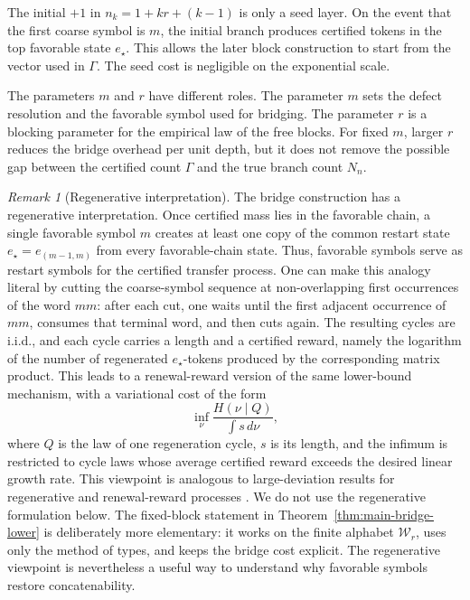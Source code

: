 \documentclass[11pt]{amsart}
\numberwithin{equation}{section}
\theoremstyle{plain}
\theoremstyle{definition}
\theoremstyle{remark}
\newtheorem{remark}[theorem]{Remark}
\begin{document}
The initial \(+1\) in \(n_k=1+kr+(k-1)\) is only a seed layer. On the event that the first coarse symbol is \(m\), the initial branch produces certified tokens in the top favorable state \(e_\star\). This allows the later block construction to start from the vector used in \(\Gamma\). The seed cost is negligible on the exponential scale.

The parameters \(m\) and \(r\) have different roles. The parameter \(m\) sets the defect resolution and the favorable symbol used for bridging. The parameter \(r\) is a blocking parameter for the empirical law of the free blocks. For fixed \(m\), larger \(r\) reduces the bridge overhead per unit depth, but it does not remove the possible gap between the certified count \(\Gamma\) and the true branch count \(N_n\).

\begin{remark}[Regenerative interpretation]\label{rem:regenerative-interpretation}
The bridge construction has a regenerative interpretation. Once certified
mass lies in the favorable chain, a single favorable symbol \(m\) creates at
least one copy of the common restart state \(e_\star=e_{(m-1,m)}\) from every
favorable-chain state. Thus, favorable symbols serve as restart symbols
for the certified transfer process.
One can make this analogy literal by cutting the coarse-symbol sequence at
non-overlapping first occurrences of the word \(mm\): after each
cut, one waits until the first adjacent occurrence of \(mm\), consumes that
terminal word, and then cuts again. The resulting cycles are i.i.d., and each
cycle carries a length and a certified reward, namely the logarithm of the
number of regenerated \(e_\star\)-tokens produced by the corresponding matrix
product. This leads to a renewal-reward version of the same lower-bound
mechanism, with a variational cost of the form
\[
\inf_\nu
\frac{H(\nu\mid Q)}{\int s\,d\nu},
\]
where \(Q\) is the law of one regeneration cycle, \(s\) is its length, and the
infimum is restricted to cycle laws whose average certified reward exceeds the
desired linear growth rate. This viewpoint is analogous to large-deviation
results for regenerative and renewal-reward processes
\cite{KuczekCrank1991,GlynnWhitt1994,Zamparo2023}.
We do not use the regenerative formulation below. The fixed-block statement in
Theorem~\ref{thm:main-bridge-lower} is deliberately more elementary: it works on
the finite alphabet \(\mathcal W_r\), uses only the method of types, and keeps
the bridge cost explicit. The regenerative viewpoint is nevertheless a useful
way to understand why favorable symbols restore concatenability.
\end{remark}
\end{document}
